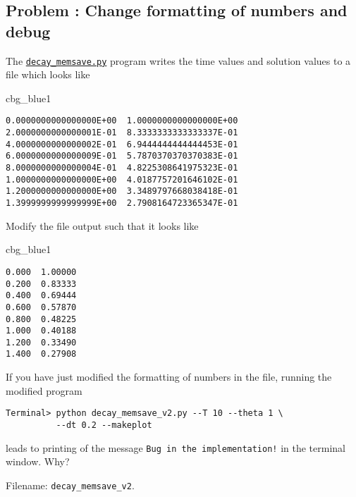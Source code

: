\documentclass[graybox,sectrefs,envcountresetchap,open=right,final]{svmonodo}
\newenvironment{_cod_tight}[1]{
   \def\FrameCommand{\colorbox{#1}}
   \FrameRule0.6pt\MakeFramed {\FrameRestore}\vskip3mm}
   {\vskip0mm\endMakeFramed}
\newenvironment{cod}[1]{
\bgroup\rmfamily
\fboxsep=0mm\relax
\begin{_cod_tight}{#1}
\list{}{\parsep=-2mm\parskip=0mm\topsep=0pt\leftmargin=2mm
\rightmargin=2\leftmargin\leftmargin=4pt\relax}
\item\relax}
{\endlist\end{_cod_tight}\egroup}
\newenvironment{doconceexercise}{}{}
\newcounter{doconceexercisecounter}
\begin{document}
\begin{doconceexercise}

\subsection*{Problem \thedoconceexercisecounter: Change formatting of numbers and debug}

\label{decay:exer:inexact:output}

The \href{{http://tinyurl.com/ofkw6kc/alg/decay_memsave.py}}{\nolinkurl{decay_memsave.py}} program
writes the time values and solution values to a file which looks
like
\begin{cod}{cbg_blue1}\begin{Verbatim}[numbers=none,fontsize=\fontsize{9pt}{9pt},baselinestretch=0.95,xleftmargin=2mm]
0.0000000000000000E+00  1.0000000000000000E+00
2.0000000000000001E-01  8.3333333333333337E-01
4.0000000000000002E-01  6.9444444444444453E-01
6.0000000000000009E-01  5.7870370370370383E-01
8.0000000000000004E-01  4.8225308641975323E-01
1.0000000000000000E+00  4.0187757201646102E-01
1.2000000000000000E+00  3.3489797668038418E-01
1.3999999999999999E+00  2.7908164723365347E-01
\end{Verbatim}
\end{cod}
\noindent
Modify the file output such that it looks like
\begin{cod}{cbg_blue1}\begin{Verbatim}[numbers=none,fontsize=\fontsize{9pt}{9pt},baselinestretch=0.95,xleftmargin=2mm]
0.000  1.00000
0.200  0.83333
0.400  0.69444
0.600  0.57870
0.800  0.48225
1.000  0.40188
1.200  0.33490
1.400  0.27908
\end{Verbatim}
\end{cod}
\noindent
If you have just modified the formatting of numbers in the file,
running the modified program
\begin{Verbatim}[frame=lines,label=\fbox{{\tiny Terminal}},framesep=2.5mm,framerule=0.7pt,fontsize=\fontsize{9pt}{9pt}]
Terminal> python decay_memsave_v2.py --T 10 --theta 1 \ 
          --dt 0.2 --makeplot
\end{Verbatim}
leads to printing of the message \Verb?Bug in the implementation!? in the
terminal window. Why?


\noindent Filename: \Verb!decay_memsave_v2!.

\end{doconceexercise}
\end{document}
